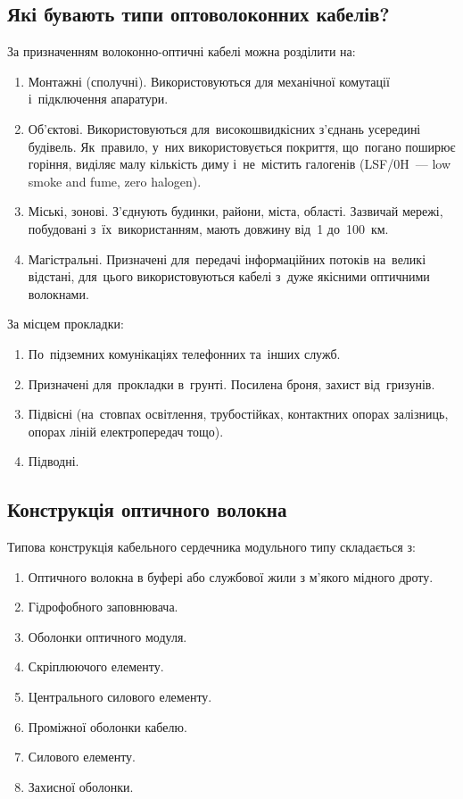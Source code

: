 \documentclass[
	a4paper,
	oneside,
	BCOR = 10mm,
	DIV = 12,
	12pt,
	headings = normal,
]{scrartcl}
\newcommand{\allcaps}[1]{{\addfontfeatures{LetterSpace = 8, Kerning = Off}#1}}
\begin{document}
		\subsection{Які бувають типи оптоволоконних кабелів?}
			За призначенням волоконно-оптичні кабелі можна розділити на:
			\begin{enumerate}
				\item Монтажні (сполучні). Використовуються для механічної комутації і~підключення апаратури.
				\item Об'єктові. Використовуються для~високошвидкісних з'єднань усередині будівель. Як~правило, у~них використовується покриття, що~погано поширює горіння, виділяє малу кількість диму і~не~містить галогенів (\textenglish{\allcaps{LSF/0H}~— low smoke and fume, zero halogen}).
				\item Міські, зонові. З'єднують будинки, райони, міста, області. Зазвичай мережі, побудовані з~їх~використанням, мають довжину від~1 до~100~км.
				\item Магістральні. Призначені для~передачі інформаційних потоків на~великі відстані, для~цього використовуються кабелі з~дуже якісними оптичними волокнами.
			\end{enumerate}
			За місцем прокладки:
			\begin{enumerate}[noitemsep]
				\item По~підземних комунікаціях телефонних та~інших служб.
				\item Призначені для~прокладки в~грунті. Посилена броня, захист від~гризунів.
				\item Підвісні (на~стовпах освітлення, трубостійках, контактних опорах залізниць, опорах ліній електропередач тощо).
				\item Підводні.
			\end{enumerate}

		\subsection{Конструкція оптичного волокна}
			Типова конструкція кабельного сердечника модульного типу складається з:
			\begin{enumerate}[noitemsep]
				\item Оптичного волокна в буфері або службової жили з м'якого мідного дроту.
				\item Гідрофобного заповнювача.
				\item Оболонки оптичного модуля.
				\item Скріплюючого елементу.
				\item Центрального силового елементу.
				\item Проміжної оболонки кабелю.
				\item Силового елементу.
				\item Захисної оболонки.
			\end{enumerate}
\end{document}
